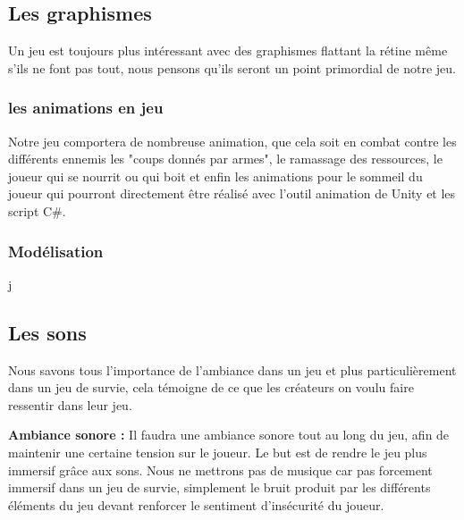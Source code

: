 \documentclass{article}
\begin{document}
\par 

\newline



\newpage
\subsection{Les graphismes}

\par
Un jeu est toujours plus intéressant avec des graphismes flattant la rétine même s'ils ne font pas tout, nous pensons qu'ils seront un point primordial de notre jeu.
\newline

\subsubsection{les animations en jeu}
\par 
Notre jeu comportera de nombreuse animation, que cela soit en combat contre les différents ennemis les "coups donnés par armes", le ramassage des ressources, le joueur qui se nourrit ou qui boit et enfin les animations pour le sommeil du joueur qui pourront directement être réalisé avec l'outil animation de Unity et les script C\#. 
\newline



\subsubsection{Modélisation}

\par 
j
\newline




\newpage
\subsection{Les sons}

\par
 Nous savons tous l'importance de l'ambiance dans un jeu et plus particulièrement dans un jeu de survie, cela témoigne de ce que les créateurs on voulu faire ressentir dans leur jeu.
\newline

\par
\textbf{Ambiance sonore :} Il faudra une ambiance sonore tout au long du jeu, afin de maintenir une certaine tension sur le joueur. Le but est de rendre le jeu plus immersif grâce aux sons. Nous ne mettrons pas de musique car pas forcement immersif dans un jeu de survie, simplement le bruit produit par les différents éléments du jeu devant renforcer le sentiment d'insécurité du joueur.
\newline
\end{document}
